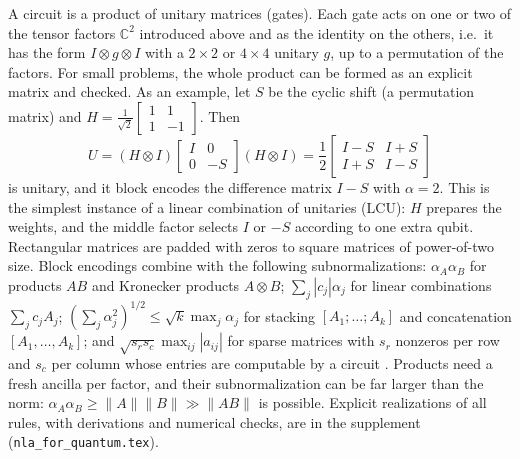 \documentclass[11pt,a4paper]{article}
\newcommand{\C}{\mathbb{C}}
\theoremstyle{remark}
\begin{document}
A circuit is a product of unitary matrices (gates). Each gate acts on one
or two of the tensor factors $\C^2$ introduced above and as the identity on
the others, i.e.\ it has the form $I\otimes g\otimes I$ with a $2\times2$ or $4\times4$ unitary $g$,
up to a permutation of the factors. For small problems, the whole product can be
formed as an explicit matrix and checked. As an example, let $S$ be the
cyclic shift (a permutation matrix) and $H=\frac1{\sqrt2}\begin{bmatrix}1&1\\1&-1\end{bmatrix}$. Then
\[
U=(H\otimes I)\begin{bmatrix}I&0\\0&-S\end{bmatrix}(H\otimes I)
=\frac12\begin{bmatrix}I-S & I+S\\ I+S & I-S\end{bmatrix}
\]
is unitary, and it block encodes the difference matrix $I-S$ with $\alpha=2$.
This is the simplest instance of a linear combination of unitaries (LCU):
$H$ prepares the weights, and the middle factor selects $I$ or $-S$ according
to one extra qubit.
Rectangular matrices are padded with zeros to square matrices of
power-of-two size. Block encodings combine with the following
subnormalizations: $\alpha_A\alpha_B$ for products $AB$ and Kronecker products $A\otimes B$;
$\sum_j|c_j|\alpha_j$ for linear combinations $\sum_jc_jA_j$; $(\sum_j\alpha_j^2)^{1/2}\le\sqrt k\max_j\alpha_j$
for stacking $[A_1;\dots;A_k]$ and concatenation $[A_1,\dots,A_k]$; and
$\sqrt{s_rs_c}\max_{ij}|a_{ij}|$ for sparse matrices with $s_r$ nonzeros per row and $s_c$
per column whose entries are computable by a circuit \cite{GSLW19}.
Products need a fresh ancilla per factor, and their subnormalization can
be far larger than the norm: $\alpha_A\alpha_B\ge\|A\|\|B\|\gg\|AB\|$ is possible. Explicit
realizations of all rules, with derivations and numerical checks, are in
the supplement (\texttt{nla\_for\_quantum.tex}).
\end{document}
